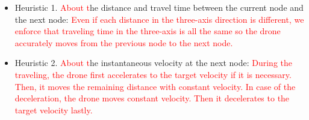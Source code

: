 \documentclass[journal]{./template/IEEEtran}
\begin{document}
\begin{itemize}
\item Heuristic 1. \textcolor{red}{About t}he distance and travel time between the current node and the next node: \textcolor{red}{Even if each distance in the three-axis direction is different, we enforce that traveling time in the three-axis is all the same so the drone accurately moves from the previous node to the next node.}

\item Heuristic 2. \textcolor{red}{About t}he instantaneous velocity at the next node: \textcolor{red}{During the traveling, the drone first accelerates to the target velocity if it is necessary. Then, it moves the remaining distance with constant velocity. In case of the deceleration, the drone moves constant velocity. Then it decelerates to the target velocity lastly.}

\end{itemize}
\end{document}

